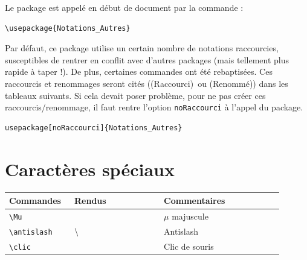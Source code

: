 \documentclass[a4paper,12pt]{article}
\newcommand{\rac}{({\color{red}Raccourci})}
\newcommand{\ren}{({\color{blue}Renommé})}
\begin{document}
		Le package est appelé en début de document par la commande :
		\begin{verbatim}
\usepackage{Notations_Autres}
		\end{verbatim}

		Par défaut, ce package utilise un certain nombre de notations raccourcies, susceptibles de rentrer en conflit avec d'autres packages (mais tellement plus rapide à taper !).
		De plus, certaines commandes ont été rebaptisées.
		Ces raccourcis et renommages seront cités (\rac\ ou \ren) dans les tableaux suivants.
		Si cela devait poser problème, pour ne pas créer ces raccourcis/renommage, il faut rentre l'option \verb!noRaccourci! à l'appel du package.

		\begin{verbatim}
usepackage[noRaccourci]{Notations_Autres}
		\end{verbatim}

	\section{Caractères spéciaux}
		\noindent
		\begin{tabular}{|p{0.2\linewidth}|p{0.3\linewidth}|p{0.4\linewidth}|}
			\hline
				\textbf{Commandes}&\textbf{Rendus}&\textbf{Commentaires}
			\\\hline\hline
				\verb!\Mu!	&	\Mu	&	$\mu$ majuscule
			\\\hline
				\verb!\antislash!	&	$\backslash$	&	Antislash
			\\\hline
				\verb!\clic!	&	\clic	&	Clic de souris
			\\\hline
		\end{tabular}	
\end{document}
